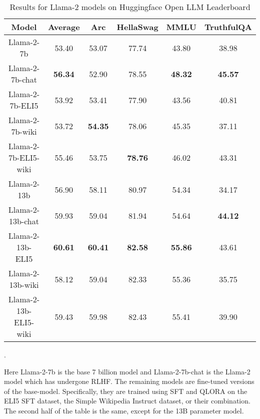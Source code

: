 \documentclass[11pt, oneside]{article}   	%
\begin{document}
\begin{table}
\begin{center}
\begin{tabular}{|c|c|c|c|c|c|}
\hline
Model &          Average & Arc & HellaSwag & MMLU & TruthfulQA \\
\hline
Llama-2-7b&                  53.40               &   53.07            & 77.74              &  43.80                &  38.98 \\
Llama-2-7b-chat  &          \textbf{56.34} &  52.90              & 78.55             &  \textbf{48.32}    &  \textbf{45.57} \\
Llama-2-7b-ELI5  &           53.92             &  53.41              & 77.90             &  43.56                 & 40.81\\
Llama-2-7b-wiki &           53.72              &  \textbf{54.35} & 78.06             &  45.35                 & 37.11\\
Llama-2-7b-ELI5-wiki&    55.46               &  53.75              & \textbf{78.76}&  46.02                   & 43.31\\
\hhline{|=|=|=|=|=|=|}
Llama-2-13b &               56.90              &   58.11             & 80.97            &  54.34            & 34.17\\
Llama-2-13b-chat&        59.93              & 59.04               & 81.94            &  54.64            & \textbf{44.12}\\
Llama-2-13b-ELI5&          \textbf{60.61} &  \textbf{60.41}  & \textbf{82.58}&  \textbf{55.86}& 43.61\\
Llama-2-13b-wiki&	        58.12             &  59.04               & 82.33            &  55.36            & 35.75\\
Llama-2-13b-ELI5-wiki&   59.43             &  59.98               & 82.43            &  55.41            & 39.90 \\
\hline
\end{tabular}
\end{center}
\caption{Results for Llama-2 models on Huggingface Open LLM Leaderboard}.
\label{table:hfleaderboard}
\end{table}
Here Llama-2-7b is the base 7 billion model and Llama-2-7b-chat is the Llama-2 model which has undergone RLHF.
The remaining models are fine-tuned versions of the base-model. 
Specifically, they are trained using SFT and QLORA on the ELI5 SFT dataset, the Simple Wikipedia Instruct dataset, or their combination. The second half of the table is the same, except for the 13B parameter model.
\end{document}
